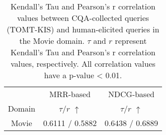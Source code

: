 \begin{table}[]
\centering
\begin{tabular}{c|cc}
   & \multicolumn{1}{c}{MRR-based} & \multicolumn{1}{c}{NDCG-based} \\
   Domain & $\tau$/$r$ $\uparrow$ & $\tau$/$r$ $\uparrow$ \\
   \hline
   Movie & 0.6111 / 0.5882 & 0.6438 / 0.6889  \\
\end{tabular}
\caption{
Kendall's Tau and Pearson's r correlation values between CQA-collected queries (TOMT-KIS) and human-elicited queries in the Movie domain.
$\tau$ and $r$ represent Kendall's Tau and Pearson's r correlation values, respectively. All correlation values have a p-value < 0.01.
}
\label{tab:human-movie-correlation}
\vspace{-10pt}
\end{table}